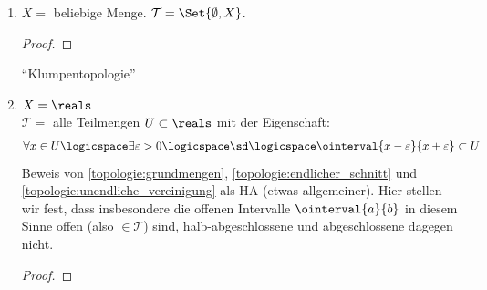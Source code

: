 \begin{beispiele}
    \begin{enumerate}
        \item \label{klumpentopologie}\( X= \) beliebige Menge. \( \mathcal{T}=\Set{\emptyset, X} \).
        \begin{proof}
        \end{proof}
        \enquote{Klumpentopologie}
        
        \item \label{standard-topologie}\( X=\reals \)\\
        \( \mathcal{T}= \) alle Teilmengen \( U\subset \reals \) mit der Eigenschaft:
        \begin{align*}
            \forall  x\in U\logicspace\exists\varepsilon>0\logicspace\sd\logicspace \ointerval{x-\varepsilon}{x+\varepsilon}\subset U
        \end{align*}
        Beweis von \ref{topologie:grundmengen}, \ref{topologie:endlicher_schnitt} und \ref{topologie:unendliche_vereinigung} als HA (etwas allgemeiner).
        Hier stellen wir fest, dass insbesondere die offenen Intervalle \( \ointerval{a}{b} \) in diesem Sinne offen (also \( \in \mathcal{T} \)) sind, halb-abgeschlossene und abgeschlossene dagegen nicht.
        \begin{proof}
            

\end{proof}
\end{enumerate}
\end{beispiele}
